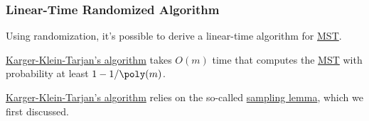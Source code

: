 \subsubsection{Linear-Time Randomized Algorithm}
Using randomization, it's possible to derive a linear-time algorithm for \hyperref[prb:MST]{MST}.

\begin{theorem}\label{thm:Karger-Klein-Tarjan}
	\hyperref[algo:Karger-Klein-Tarjan]{Karger-Klein-Tarjan's algorithm} takes \(O(m)\) time that computes the \hyperref[prb:MST]{MST} with probability at least \(1 - 1 / \poly(m)\).
\end{theorem}

\hyperref[algo:Karger-Klein-Tarjan]{Karger-Klein-Tarjan's algorithm} relies on the so-called \hyperref[lma:sampling]{sampling lemma}, which we first discussed.

